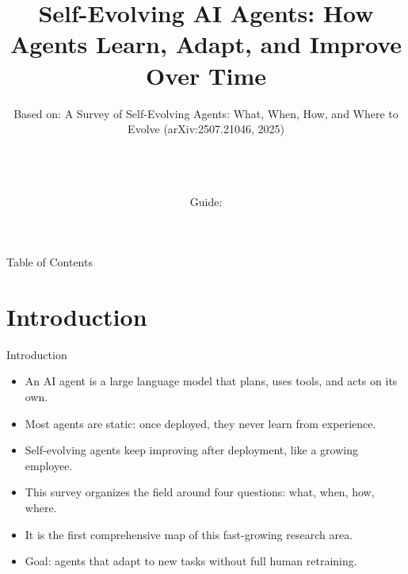 \documentclass[10pt]{beamer}
\title[B.Tech Seminar]{Self-Evolving AI Agents: How Agents Learn, Adapt, and Improve Over Time}
\subtitle{Based on: A Survey of Self-Evolving Agents: What, When, How, and Where to Evolve (arXiv:2507.21046, 2025)}
\author[\studentname\ (\shortinst)]{\studentname \\ \small \rollno \\ \small \rollclass \\ \small Guide: \guidename}
\institute[]{\deptname \\ \collegename}
\date{\seminardate}
\begin{document}
\begin{frame}[plain]
  \titlepage
\end{frame}
\begin{frame}{Table of Contents}
  \tableofcontents
\end{frame}
\section{Introduction}
\begin{frame}{Introduction}
\begin{itemize}
  \item An AI agent is a large language model that plans, uses tools, and acts on its own.
  \item Most agents are static: once deployed, they never learn from experience.
  \item Self-evolving agents keep improving after deployment, like a growing employee.
  \item This survey organizes the field around four questions: what, when, how, where.
  \item It is the first comprehensive map of this fast-growing research area.
  \item Goal: agents that adapt to new tasks without full human retraining.
\end{itemize}
\end{frame}
\end{document}
